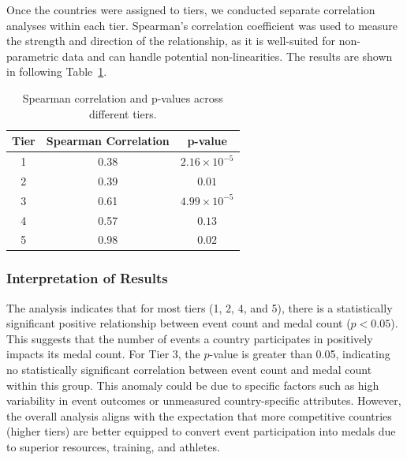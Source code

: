\documentclass{mcmthesis}
\begin{document}
    
    
    Once the countries were assigned to tiers, we conducted separate correlation analyses within each tier. Spearman's correlation coefficient was used to measure the strength and direction of the relationship, as it is well-suited for non-parametric data and can handle potential non-linearities. The results are shown in following Table~\ref{tab1}.



\begin{table}[h!]
    \centering
    \begin{tabular}{ccc}
    \toprule
    \textbf{Tier} & \textbf{Spearman Correlation} & \textbf{p-value} \\
    \midrule
    1 & 0.38 & $2.16 \times 10^{-5}$ \\
    2 & 0.39 & $0.01$ \\
    3 & 0.61 & $4.99 \times 10^{-5}$ \\
    4 & 0.57 & $0.13$ \\
    5 & 0.98 & $0.02$ \\
    \bottomrule
    \end{tabular}
    \caption{Spearman correlation and p-values across different tiers.}
    \label{tab1}
\end{table}

\subsubsection{Interpretation of Results}
The analysis indicates that for most tiers (1, 2, 4, and 5), there is a statistically significant positive relationship between event count and medal count ($p < 0.05$). This suggests that the number of events a country participates in positively impacts its medal count. For Tier 3, the $p$-value is greater than 0.05, indicating no statistically significant correlation between event count and medal count within this group. This anomaly could be due to specific factors such as high variability in event outcomes or unmeasured country-specific attributes. However, the overall analysis aligns with the expectation that more competitive countries (higher tiers) are better equipped to convert event participation into medals due to superior resources, training, and athletes.

\end{document}
